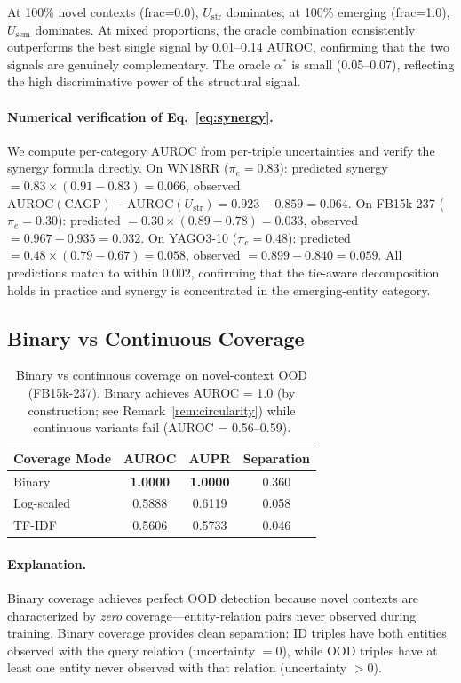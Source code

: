 \documentclass{article}
\begin{document}
At 100\% novel contexts (frac=0.0), $U_{\text{str}}$ dominates; at 100\% emerging (frac=1.0), $U_{\text{sem}}$ dominates. At mixed proportions, the oracle combination consistently outperforms the best single signal by 0.01--0.14 AUROC, confirming that the two signals are genuinely complementary. The oracle $\alpha^*$ is small (0.05--0.07), reflecting the high discriminative power of the structural signal.

\paragraph{Numerical verification of Eq.~\ref{eq:synergy}.}
We compute per-category AUROC from per-triple uncertainties and verify the synergy formula directly. On WN18RR ($\pi_e{=}0.83$): predicted synergy $= 0.83 \times (0.91 - 0.83) = 0.066$, observed $\text{AUROC}(\text{CAGP}) - \text{AUROC}(U_{\text{str}}) = 0.923 - 0.859 = 0.064$. On FB15k-237 ($\pi_e{=}0.30$): predicted $= 0.30 \times (0.89 - 0.78) = 0.033$, observed $= 0.967 - 0.935 = 0.032$. On YAGO3-10 ($\pi_e{=}0.48$): predicted $= 0.48 \times (0.79 - 0.67) = 0.058$, observed $= 0.899 - 0.840 = 0.059$. All predictions match to within 0.002, confirming that the tie-aware decomposition holds in practice and synergy is concentrated in the emerging-entity category.

\subsection{Binary vs Continuous Coverage}
\label{app:coverage_ablation}

\begin{table}[ht]
\centering
\caption{Binary vs continuous coverage on novel-context OOD (FB15k-237). Binary achieves AUROC = 1.0 (by construction; see Remark~\ref{rem:circularity}) while continuous variants fail (AUROC = 0.56--0.59).}
\label{tab:coverage_ablation}
\begin{tabular}{lccc}
\toprule
Coverage Mode & AUROC & AUPR & Separation \\
\midrule
Binary & \textbf{1.0000} & \textbf{1.0000} & 0.360 \\
Log-scaled & 0.5888 & 0.6119 & 0.058 \\
TF-IDF & 0.5606 & 0.5733 & 0.046 \\
\bottomrule
\end{tabular}
\end{table}

\paragraph{Explanation.}
Binary coverage achieves perfect OOD detection because novel contexts are characterized by \emph{zero} coverage---entity-relation pairs never observed during training. Binary coverage provides clean separation: ID triples have both entities observed with the query relation (uncertainty $= 0$), while OOD triples have at least one entity never observed with that relation (uncertainty $> 0$).
\end{document}
